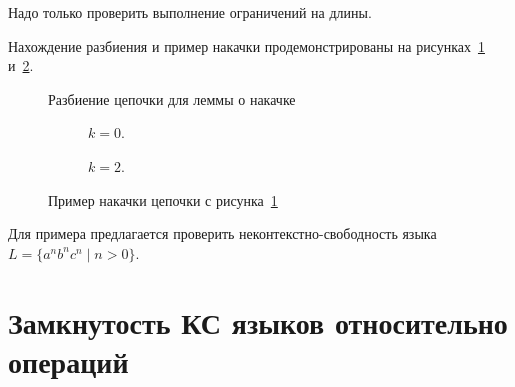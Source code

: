 Надо только проверить выполнение ограничений на длины.

Нахождение разбиения и пример накачки продемонстрированы на рисунках~\ref{fig:pumping1} и~\ref{fig:pumping2}.

\begin{figure}
\centering

\caption{Разбиение цепочки для леммы о накачке}
\label{fig:pumping1}
\end{figure}

\begin{figure}
\centering
  \begin{subfigure}[b]{0.4\textwidth}
    \centering
    
    \caption{$k = 0$.}
  \end{subfigure}
\hfill
  \begin{subfigure}[b]{0.4\textwidth}
    \centering
    
    \caption{$k = 2$.}
  \end{subfigure}
\caption{Пример накачки цепочки с рисунка~\ref{fig:pumping1}}
\label{fig:pumping2}
\end{figure}


Для примера предлагается проверить неконтекстно-свободность языка $L=\{a^nb^nc^n \mid n>0\}$.


\section{Замкнутость КС языков относительно операций}


